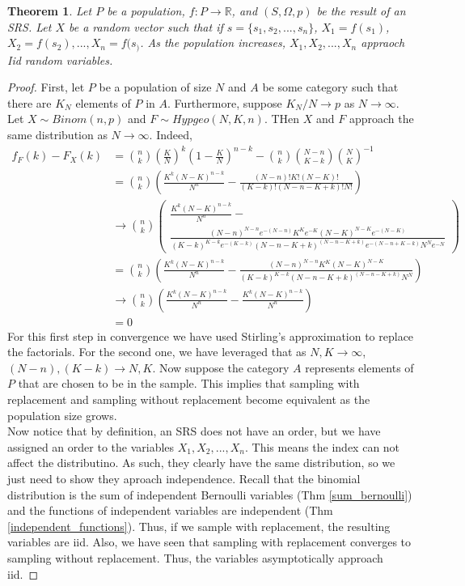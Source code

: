 \documentclass{article}
\newtheorem{theorem}{Theorem}
\theoremstyle{definition}\newtheorem{definition}{DEF}
\theoremstyle{definition}\newtheorem{example}{Ex}
\theoremstyle{lemma}\newtheorem{lemma}{Lemma}
\theoremstyle{corrolary}\newtheorem{corrolary}{Cor}
\begin{document}
\begin{theorem}
Let $P$ be a population, $f: P\rightarrow \mathbb{R}$, and $(S, \Omega, p)$ be the result of an SRS.
Let $X$ be a random vector such that if $s=\{s_1, s_2, ..., s_n\}$,  $X_1=f(s_1)$, $X_2 = f(s_2), ..., X_n = f(s_)$.
As the population increases, $X_1, X_2, ..., X_n$ appraoch Iid random variables.
\end{theorem}
\begin{proof}
First, let $P$ be a population of size $N$ and $A$ be some category such that there are $K_N$ elements of $P$ in $A$.
Furthermore, suppose $K_N / N \rightarrow p$ as $N \rightarrow \infty$.
Let $X \sim Binom(n,p)$ and $F\sim Hypgeo(N, K, n)$.
THen $X$ and $F$ approach the same distribution as $N\rightarrow \infty$.
Indeed,
\begin{align*}
f_F(k) - F_X(k)
&= \binom{n}{k} \left(\frac{K}{N}\right)^k \left( 1-\frac{K}{N}\right)^{n-k} - \binom{n}{k}\binom{N-n}{K-k}\binom{N}{K}^{-1}\\
&= \binom{n}{k} \left( \frac{K^k(N-K)^{n-k}}{N^n} - \frac{(N-n)!K!(N-K)!}{(K-k)!(N-n-K+k)!N!}\right) \\
&\rightarrow \binom{n}{k} \left( 
\begin{multlined}
\frac{K^k(N-K)^{n-k}}{N^n} - \\
\frac{(N-n)^{N-n}e^{-(N-n)}K^Ke^{-K}(N-K)^{N-K}e^{-(N-K)}}{(K-k)^{K-k}e^{-(K-k)}(N-n-K+k)^{(N-n-K+k)}e^{-(N-n+K-k)}N^Ne^{-N}}
\end{multlined}
\right) \\
&= \binom{n}{k} \left( 
\frac{K^k(N-K)^{n-k}}{N^n} -
\frac{(N-n)^{N-n}K^K(N-K)^{N-K}}{(K-k)^{K-k}(N-n-K+k)^{(N-n-K+k)}N^N}
\right) \\
&\rightarrow \binom{n}{k} \left( \frac{K^k(N-K)^{n-k}}{N^n} - \frac{K^k (N-K)^{n-k}}{N^n} \right) \\
&=0
\end{align*}
For this first step in convergence we have used Stirling's approximation to replace the factorials.
For the second one, we have leveraged that as $N,K\rightarrow \infty$, $(N-n), (K-k)\rightarrow N,K$. 
Now suppose the category $A$ represents elements of $P$ that are chosen to be in the sample.
This implies that sampling with replacement and sampling without replacement become equivalent as the population size grows.\\
Now notice that by definition, an SRS does not have an order, but we have assigned an order to the variables $X_1, X_2, ..., X_n$.
This means the index can not affect the distributino.
As such, they clearly have the same distribution, so we just need to show they aproach independence.
Recall that the binomial distribution is the sum of independent Bernoulli variables (Thm \ref{sum_bernoulli}) and the functions of independent variables are independent (Thm \ref{independent_functions}).
Thus, if we sample with replacement, the resulting variables are iid.
Also, we have seen that sampling with replacement converges to sampling without replacement.
Thus, the variables asymptotically approach iid.
\end{proof}
\end{document}
